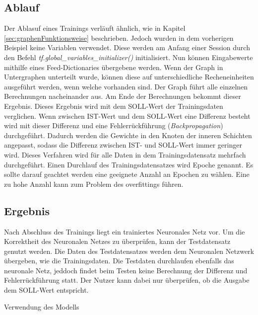 \subsection{Ablauf}
\label{sec:ablauf}
Der Ablasuf eines Trainings verläuft ähnlich, wie in Kapitel \ref{sec:graphenFunktionsweise} beschrieben. Jedoch wurden in dem vorherigen Beispiel keine Variablen verwendet. Diese werden am Anfang einer Session durch den Befehl \textit{tf.global\_variables\_initializer()} initialisiert. Nun können Eingabewerte mithilfe eines Feed-Dictionaries übergebene werden. Wenn der Graph in Untergraphen unterteilt wurde, können diese auf unterschiedliche Recheneinheiten ausgeführt werden, wenn welche vorhanden sind. Der Graph führt alle einzelnen Berechnungen nacheinander aus. Am Ende der Berechnungen bekommt dieser Ergebnis. Dieses Ergebnis wird mit dem SOLL-Wert der Trainingsdaten verglichen. Wenn zwischen IST-Wert und dem SOLL-Wert eine Differenz besteht wird mit dieser Differenz und eine Fehlerrückführung (\textit{Backpropagation}) durchgeführt. Dadurch werden die Gewichte in den Knoten der inneren Schichten angepasst, sodass die Differenz zwischen IST- und SOLL-Wert immer geringer wird. Dieses Verfahren wird für alle Daten in dem Trainingsdatensatz mehrfach durchgeführt. Einen Durchlauf des Trainingsdatensatzes wird Epoche genannt. Es sollte darauf geachtet werden eine geeignete Anzahl an Epochen zu wählen. Eine zu hohe Anzahl kann zum Problem des overfittings führen.

\subsection{Ergebnis}
\label{sec:ergebnis}
Nach Abschluss des Trainings liegt ein trainiertes Neuronales Netz vor. Um die Korrektheit des Neuronalen Netzes zu überprüfen, kann der Testdatensatz genutzt werden. Die Daten des Testdatensatzes werden dem Neuronalen Netzwerk übergeben, wie die Trainingsdaten. Die Testdaten durchlaufen ebenfalls das neuronale Netz, jeddoch findet beim Testen keine Berechnung der Differenz und Fehlerrückführung statt. Der Nutzer kann dabei nur überprüfen, ob die Ausgabe dem SOLL-Wert entspricht. 

Verwendung des Modells

